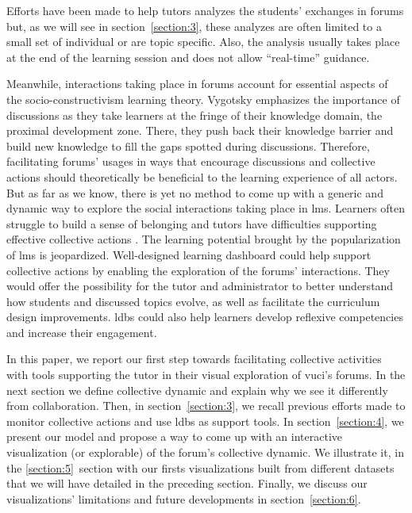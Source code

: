 \documentclass[a4paper,twoside]{article}
\begin{document}
Efforts have been made to help tutors analyzes the students' exchanges in forums but, as we will see in section~\ref{section:3}, these analyzes are often limited to a small set of individual or are topic specific.  Also, the analysis usually takes place at the end of the learning session and does not allow ``real-time'' guidance.

Meanwhile, interactions taking place in forums account for essential aspects of the socio-constructivism learning theory.  Vygotsky emphasizes the importance of discussions as they take learners at the fringe of their knowledge domain, the proximal development zone.  There, they push back their knowledge barrier and build new knowledge to fill the gaps spotted during discussions.  Therefore, facilitating forums' usages in ways that encourage discussions and collective actions should theoretically be beneficial to the learning experience of all actors.  But as far as we know, there is yet no method to come up with a generic and dynamic way to explore the social interactions taking place in \gls{lms}.  Learners often struggle to build a sense of belonging \citep{Khalil2014} and tutors have difficulties supporting effective collective actions \citep{Zheng2015}.  The learning potential brought by the popularization of \gls{lms} is jeopardized.
Well-designed learning dashboard could help support collective actions by enabling the exploration of the forums' interactions.  They would offer the possibility for the tutor and administrator to better understand how students and discussed topics evolve, as well as facilitate the curriculum design improvements.  \glspl{ldb} could also help learners develop reflexive competencies and increase their engagement.


In this paper, we report our first step towards facilitating collective activities with tools supporting the tutor in their visual exploration of \gls{vuci}'s forums.
In the next section we define collective dynamic and explain why we see it differently from collaboration.  Then, in section~\ref{section:3}, we recall previous efforts made to  monitor collective actions and use \glspl{ldb} as support tools.  In section~\ref{section:4}, we present our model and propose a way to come up with an interactive visualization (or explorable) of the forum's collective dynamic.  We illustrate it, in the \ref{section:5}~section with our firsts visualizations built from different datasets that we will have detailed in the preceding section.  Finally, we discuss our visualizations' limitations and future developments in section~\ref{section:6}.
\end{document}
